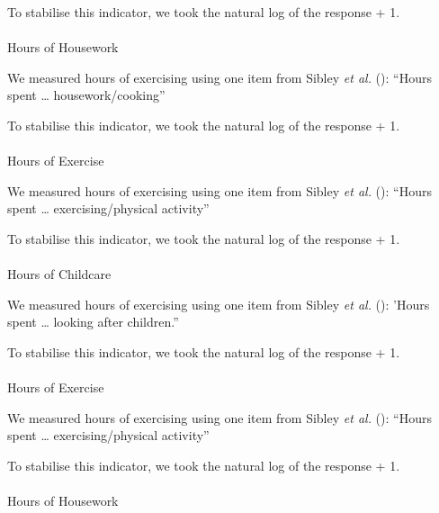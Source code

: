 \documentclass[
  single column]{article}
\makeatletter
\let\oldparagraph\paragraph
\renewcommand{\paragraph}{
    \@ifstar
      \xxxParagraphStar
      \xxxParagraphNoStar
  }
\newcommand{\xxxParagraphStar}[1]{\oldparagraph*{#1}\mbox{}}
\newcommand{\xxxParagraphNoStar}[1]{\oldparagraph{#1}\mbox{}}
\makeatother
\begin{document}
To stabilise this indicator, we took the natural log of the response +
1.

\paragraph{Hours of Housework}\label{hours-of-housework}

We measured hours of exercising using one item from Sibley \emph{et al.}
(): ``Hours spent \ldots{}
housework/cooking''

To stabilise this indicator, we took the natural log of the response +
1.

\paragraph{Hours of Exercise}\label{hours-of-exercise}

We measured hours of exercising using one item from Sibley \emph{et al.}
(): ``Hours spent \ldots{}
exercising/physical activity''

To stabilise this indicator, we took the natural log of the response +
1.

\paragraph{Hours of Childcare}\label{hours-of-childcare-1}

We measured hours of exercising using one item from Sibley \emph{et al.}
(): 'Hours spent \ldots{} looking after
children.''

To stabilise this indicator, we took the natural log of the response +
1.

\paragraph{Hours of Exercise}\label{hours-of-exercise-1}

We measured hours of exercising using one item from Sibley \emph{et al.}
(): ``Hours spent \ldots{}
exercising/physical activity''

To stabilise this indicator, we took the natural log of the response +
1.

\paragraph{Hours of Housework}\label{hours-of-housework-1}
\end{document}
